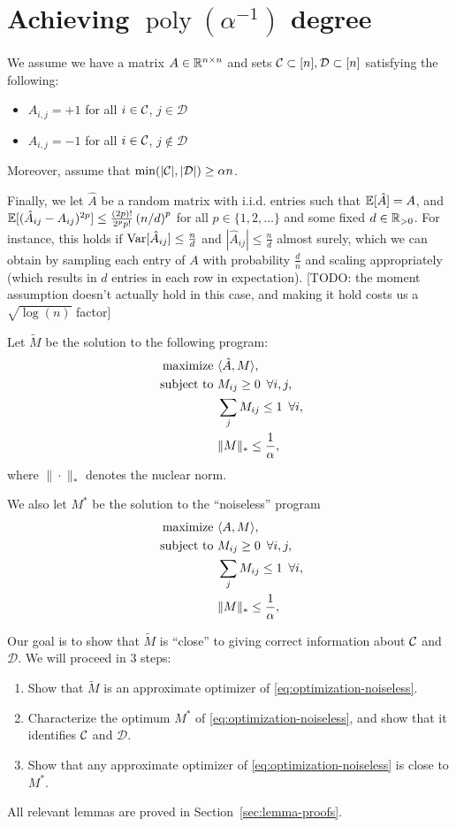 \documentclass[11pt]{article}
\newcommand{\M}{\tilde{M}}
\newcommand{\A}{\hat{A}}
\DeclareMathOperator{\poly}{poly}
\newcommand{\sD}{\mathcal{D}}
\newcommand{\todo}[1]{{\color{red} [TODO: {#1}]}}
\begin{document}
\section{Achieving $\poly(\alpha^{-1})$ degree}
We assume we have a matrix $A \in \mathbb{R}^{n \times n}$ and sets 
$\sC \subset [n], \sD \subset [n]$ satisfying the following:
\begin{itemize}
\item $A_{i,j} = +1$ for all $i \in \mathcal{C}$, $j \in \sD$
\item $A_{i,j} = -1$ for all $i \in \mathcal{C}$, $j \not\in \sD$
\end{itemize}
Moreover, assume that $\min(|\sC|, |\sD|) \geq \alpha n$.

Finally, we let $\A$ be a random matrix with i.i.d. entries such that $\bE[\A] = A$, 
and $\bE[(\A_{ij}-A_{ij})^{2p}] \leq \frac{(2p)!}{2^pp!} \p{n/d}^{p}$ for all $p \in \{1,2,\ldots\}$ 
and some fixed $d \in \mathbb{R}_{>0}$. For instance, this holds if $\Var[\A_{ij}] \leq \frac{n}{d}$ and $|\A_{ij}| \leq \frac{n}{d}$ almost surely, 
which we can obtain by sampling each entry of $A$ with probability $\frac{d}{n}$ and scaling appropriately (which results in $d$ entries in 
each row in expectation).
\todo{the moment assumption doesn't actually hold in this case, and making it hold costs us a $\sqrt{\log(n)}$ factor}

Let $\M$ be the solution to the following program:
\begin{align}
\label{eq:optimization-noisy}
\text{maximize } &\langle \A, M \rangle, \\
\notag \text{ subject to } &M_{ij} \geq 0 \,\,\, \forall i,j, \\
\notag  &\sum_j M_{ij} \leq 1 \,\,\, \forall i, \\
\notag  &\|M\|_* \leq \frac{1}{\alpha},
\end{align}
where $\|\cdot\|_*$ denotes the nuclear norm.

We also let $M^*$ be the solution to the ``noiseless'' program
\begin{align}
\label{eq:optimization-noiseless}
\text{maximize } &\langle A, M \rangle, \\
\notag \text{ subject to } &M_{ij} \geq 0 \,\,\, \forall i,j, \\
\notag  &\sum_j M_{ij} \leq 1 \,\,\, \forall i, \\
\notag  &\|M\|_* \leq \frac{1}{\alpha},
\end{align}

Our goal is to show that $\M$ is ``close'' to giving correct information about $\mathcal{C}$ and $\sD$. 
We will proceed in $3$ steps:
\begin{enumerate}
\item Show that $\M$ is an approximate optimizer of \eqref{eq:optimization-noiseless}.
\item Characterize the optimum $M^*$ of \eqref{eq:optimization-noiseless}, and show that it identifies $\mathcal{C}$ and $\sD$.
\item Show that any approximate optimizer of \eqref{eq:optimization-noiseless} is close to $M^*$.
\end{enumerate}
All relevant lemmas are proved in Section~\ref{sec:lemma-proofs}.
\end{document}
